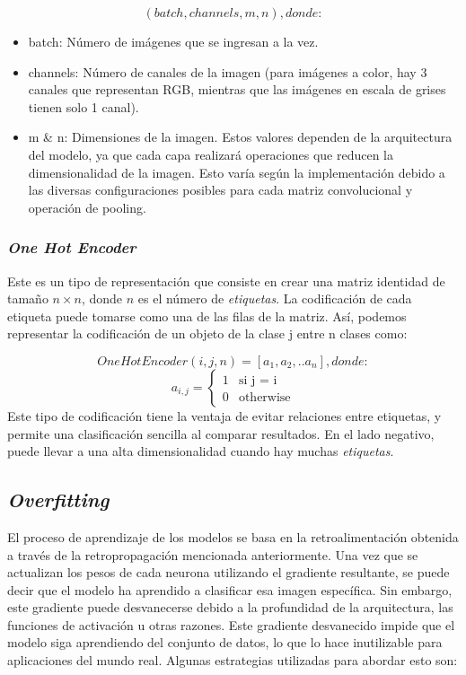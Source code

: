 $$(batch, channels, m, n), donde:$$
\begin{itemize}
    \item batch: Número de imágenes que se ingresan a la vez.
    \item channels: Número de canales de la imagen (para imágenes a color, hay 3 canales que representan RGB, mientras que las imágenes en escala de grises tienen solo 1 canal).
    \item m \& n: Dimensiones de la imagen. Estos valores dependen de la arquitectura del modelo, ya que cada capa realizará operaciones que reducen la dimensionalidad de la imagen. Esto varía según la implementación debido a las diversas configuraciones posibles para cada matriz convolucional y operación de pooling.
\end{itemize}

\subsubsection{\textit{One Hot Encoder}}
Este es un tipo de representación que consiste en crear una 
matriz identidad de tamaño $n \times n$, donde $n$ es 
el número de \textit{etiquetas}. La codificación de cada 
etiqueta puede tomarse como una de las filas de la matriz. 
Así, podemos representar la codificación de un objeto de 
la clase j entre n clases como:

$$OneHotEncoder(i,j,n)= [a_1,a_2, .. a_n], donde: $$
\begin{equation*}
a_{i,j}=
\begin{cases}
1 & \text{si j = i}\\
0 &  \text{otherwise}
\end{cases}
\end{equation*}
Este tipo de codificación tiene la ventaja de evitar 
relaciones entre etiquetas, y permite una clasificación 
sencilla al comparar resultados. En el lado negativo, 
puede llevar a una alta dimensionalidad cuando hay muchas 
\textit{etiquetas}.

\subsection{\textit{Overfitting}}
El proceso de aprendizaje de los modelos se basa en la retroalimentación 
obtenida a través de la retropropagación mencionada anteriormente. 
Una vez que se actualizan los pesos de cada neurona utilizando el 
gradiente resultante, se puede decir que el modelo ha aprendido 
a clasificar esa imagen específica. Sin embargo, este gradiente 
puede desvanecerse debido a la profundidad de la arquitectura, 
las funciones de activación u otras razones. Este gradiente 
desvanecido impide que el modelo siga aprendiendo del 
conjunto de datos, lo que lo hace inutilizable para aplicaciones 
del mundo real. Algunas estrategias utilizadas para abordar 
esto son:

